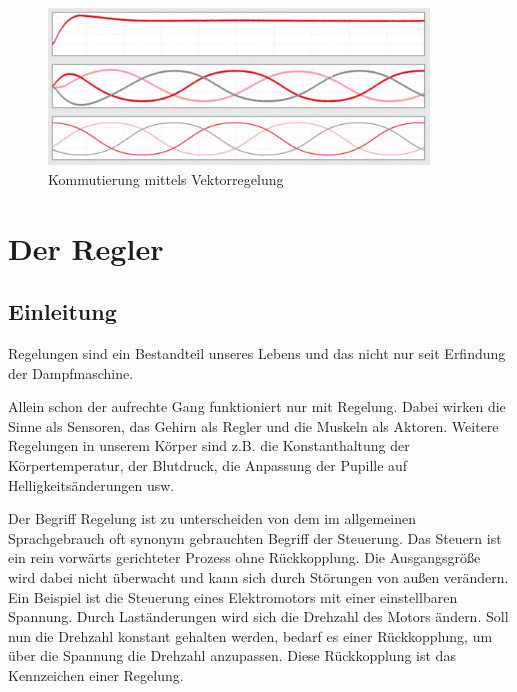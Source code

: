 \begin{figure}[H]
	\begin{center}
		\includegraphics[width=0.9\textwidth]{figures/antrieb/Kommutierung_Vektorregelung.png}
		\caption{Kommutierung mittels Vektorregelung\cite{Feldorientierte-Antriebssteuerung}}
	\end{center}
\end{figure}


\newpage



\section{Der Regler}
\subsection{Einleitung}
Regelungen sind ein Bestandteil unseres Lebens und das nicht nur seit Erfindung der Dampfmaschine.

Allein schon der aufrechte Gang funktioniert nur mit Regelung. Dabei wirken die Sinne als Sensoren, das Gehirn als Regler und die Muskeln als Aktoren. Weitere Regelungen in unserem Körper sind z.B. die Konstanthaltung der Körpertemperatur, der Blutdruck, die Anpassung der Pupille auf Helligkeitsänderungen usw.

Der Begriff Regelung ist zu unterscheiden von dem im allgemeinen Sprachgebrauch oft synonym gebrauchten Begriff der Steuerung. Das Steuern ist ein rein vorwärts gerichteter Prozess ohne Rückkopplung. Die Ausgangsgröße wird dabei nicht überwacht und kann sich durch Störungen von außen verändern. Ein Beispiel ist die Steuerung eines Elektromotors mit einer einstellbaren Spannung. Durch Laständerungen wird sich die Drehzahl des Motors ändern. Soll nun die Drehzahl konstant gehalten werden, bedarf es einer Rückkopplung, um über die Spannung die Drehzahl anzupassen. Diese Rückkopplung ist das Kennzeichen einer Regelung.

